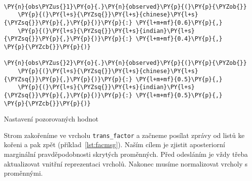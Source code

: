\begin{example}
\begin{Verbatim}[commandchars=\\\{\}]

\PY{n}{obs\PYZus{}1}\PY{o}{.}\PY{n}{observed}\PY{p}{(}\PY{p}{\PYZob{}}
	\PY{p}{(}\PY{l+s}{\PYZsq{}}\PY{l+s}{chinese}\PY{l+s}{\PYZsq{}}\PY{p}{,}\PY{p}{)}\PY{p}{:} \PY{l+m+mf}{0.6}\PY{p}{,}
	\PY{p}{(}\PY{l+s}{\PYZsq{}}\PY{l+s}{indian}\PY{l+s}{\PYZsq{}}\PY{p}{,}\PY{p}{)}\PY{p}{:} \PY{l+m+mf}{0.4}\PY{p}{,}
\PY{p}{\PYZcb{}}\PY{p}{)}

\PY{n}{obs\PYZus{}2}\PY{o}{.}\PY{n}{observed}\PY{p}{(}\PY{p}{\PYZob{}}
	\PY{p}{(}\PY{l+s}{\PYZsq{}}\PY{l+s}{chinese}\PY{l+s}{\PYZsq{}}\PY{p}{,}\PY{p}{)}\PY{p}{:} \PY{l+m+mf}{0.5}\PY{p}{,}
	\PY{p}{(}\PY{l+s}{\PYZsq{}}\PY{l+s}{indian}\PY{l+s}{\PYZsq{}}\PY{p}{,}\PY{p}{)}\PY{p}{:} \PY{l+m+mf}{0.5}\PY{p}{,}
\PY{p}{\PYZcb{}}\PY{p}{)}
\end{Verbatim}
\caption{Nastavení pozorovaných hodnot}
\label{lst:facobs}
\end{example}

%

Strom zakořeníme ve vrcholu \texttt{trans\_factor} a začneme posílat zprávy od listů ke kořeni a pak zpět (příklad~\ref{lst:facmsg}).
Naším cílem je zjistit aposteriorní marginální pravděpodobnosti skrytých proměnných.
Před odesláním je vždy třeba aktualizovat vnitřní reprezentaci vrcholů.
Nakonec musíme normalizovat vrcholy s proměnnými.

